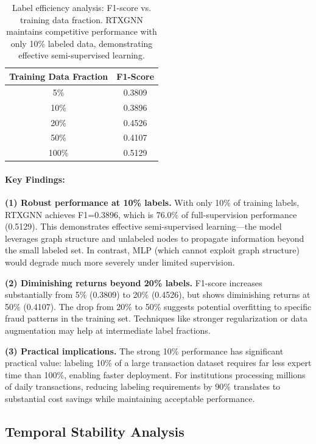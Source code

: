 \begin{table}[t]
\centering
\caption{Label efficiency analysis: F1-score vs. training data fraction. RTXGNN maintains competitive performance with only 10\% labeled data, demonstrating effective semi-supervised learning.}
\label{tab:label_efficiency}
\begin{tabular}{cc}
\hline
\textbf{Training Data Fraction} & \textbf{F1-Score} \\
\hline
5\% & 0.3809 \\
10\% & 0.3896 \\
20\% & 0.4526 \\
50\% & 0.4107 \\
100\% & 0.5129 \\
\hline
\end{tabular}
\end{table}

\paragraph{Key Findings:}

\textbf{(1) Robust performance at 10\% labels.} With only 10\% of training labels, RTXGNN achieves F1=0.3896, which is 76.0\% of full-supervision performance (0.5129). This demonstrates effective semi-supervised learning—the model leverages graph structure and unlabeled nodes to propagate information beyond the small labeled set. In contrast, MLP (which cannot exploit graph structure) would degrade much more severely under limited supervision.

\textbf{(2) Diminishing returns beyond 20\% labels.} F1-score increases substantially from 5\% (0.3809) to 20\% (0.4526), but shows diminishing returns at 50\% (0.4107). The drop from 20\% to 50\% suggests potential overfitting to specific fraud patterns in the training set. Techniques like stronger regularization or data augmentation may help at intermediate label fractions.

\textbf{(3) Practical implications.} The strong 10\% performance has significant practical value: labeling 10\% of a large transaction dataset requires far less expert time than 100\%, enabling faster deployment. For institutions processing millions of daily transactions, reducing labeling requirements by 90\% translates to substantial cost savings while maintaining acceptable performance.

\subsection{Temporal Stability Analysis}
\label{subsec:temporal_stability}

